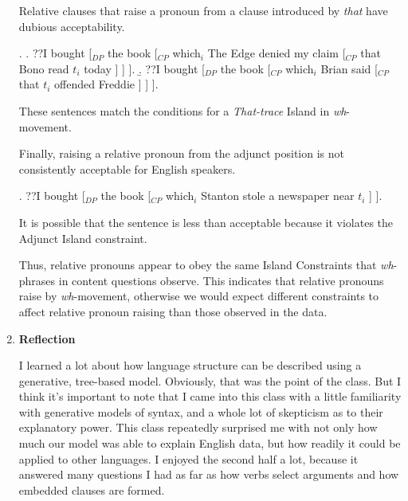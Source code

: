 \documentclass[a4paper, 11pt]{article}
\begin{document}
\begin{enumerate}[label=\textbf{\arabic*.}]
Relative clauses that raise a pronoun from a clause introduced by \emph{that} have dubious
acceptability.

\ex.
    \a. ??I bought [$_{DP}$ the book 
        [$_{CP}$ which$_{i}$ The Edge denied my claim
            [$_{CP}$ that Bono read $t_{i}$ today
            ]
        ]
    ].
    \b. ??I bought [$_{DP}$ the book 
        [$_{CP}$ which$_{i}$ Brian said
            [$_{CP}$ that $t_{i}$ offended Freddie
            ]
        ]
    ].

These sentences match the conditions for a \emph{That-trace} Island in \emph{wh}-movement.

Finally, raising a relative pronoun from the adjunct position is not consistently acceptable for
English speakers.

\ex. ??I bought [$_{DP}$ the book 
    [$_{CP}$ which$_{i}$ Stanton stole a newspaper near $t_{i}$ ]
].

It is possible that the sentence is less than acceptable because it violates the Adjunct Island
constraint.

Thus, relative pronouns appear to obey the same Island Constraints that \emph{wh}-phrases in
content questions observe. This indicates that relative pronouns raise by \emph{wh}-movement,
otherwise we would expect different constraints to affect relative pronoun raising than
those observed in the data.

\item \textbf{Reflection}

I learned a lot about how language structure can be described using a generative, tree-based model.
Obviously, that was the point of the class. But I think it's important to note that I came into
this class with a little familiarity with generative models of syntax, and a whole lot of skepticism
as to their explanatory power. This class repeatedly surprised me with not only how much our model
was able to explain English data, but how readily it could be applied to other languages. I enjoyed
the second half a lot, because it answered many questions I had as far as how verbs select arguments
and how embedded clauses are formed.


\end{enumerate}
\end{document}
